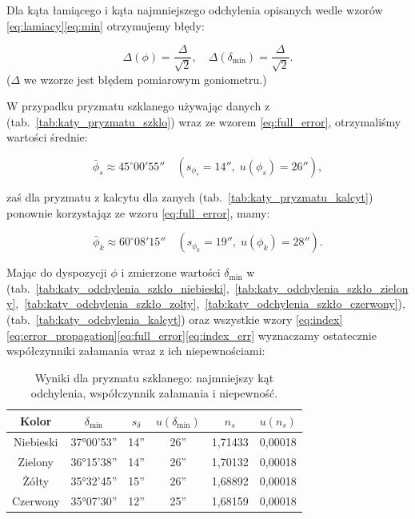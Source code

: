 \documentclass[12pt]{article}
\begin{document}
Dla kąta łamiącego i kąta najmniejszego odchylenia opisanych wedle wzorów \eqref{eq:lamiacy}\eqref{eq:min} otrzymujemy błędy: 

\[
    \Delta(\phi) = \frac{\Delta}{\sqrt{2}}, \quad
    \Delta(\delta_{\mathrm{min}}) = \frac{\Delta}{\sqrt{2}}.
\]
($\Delta$ we wzorze jest błędem pomiarowym goniometru.)

W przypadku pryzmatu szklanego używając danych z (tab.~\ref{tab:katy_pryzmatu_szklo}) wraz ze wzorem \eqref{eq:full_error}, otrzymaliśmy wartości średnie:

\[
    \bar{\phi}_{s} \approx 45^\circ00'55'' \quad (s_{\phi_{s}} = 14'',\; u(\phi_{s}) = 26''),
\]

zaś dla pryzmatu z kalcytu dla zanych (tab.~\ref{tab:katy_pryzmatu_kalcyt}) ponownie korzystająz ze wzoru \eqref{eq:full_error}, mamy:

\[
    \bar{\phi}_{k} \approx 60^\circ08'15'' \quad (s_{\phi_{k}} = 19'',\; u(\phi_{k}) = 28'').
\]

Mając do dyspozycji $\phi$ i zmierzone wartości $\delta_{\mathrm{min}}$ w (tab.~\ref{tab:katy_odchylenia_szkło_niebieski},~\ref{tab:katy_odchylenia_szkło_zielony},~\ref{tab:katy_odchylenia_szkło_zolty},~\ref{tab:katy_odchylenia_szkło_czerwony}), (tab.~\ref{tab:katy_odchylenia_kalcyt})
oraz wszystkie wzory \eqref{eq:index}\eqref{eq:error_propagation}\eqref{eq:full_error}\eqref{eq:index_err} wyznaczamy ostatecznie współczynniki załamania wraz z ich niepewnościami:

\begin{table}[H]
    \centering
    \begin{tabular}{c|ccccc}
        \toprule
        \textbf{Kolor} & $\delta_{\mathrm{min}}$ & $s_{\delta}$ & $u(\delta_{\mathrm{min}})$ & $n_{s}$ & $u(n_{s})$ \\
        \midrule
        Niebieski & 37°00'53'' & 14'' & 26'' & 1{,}71433 & 0{,}00018 \\
        Zielony   & 36°15'38'' & 14'' & 26'' & 1{,}70132 & 0{,}00018 \\
        Żółty     & 35°32'45'' & 15'' & 26'' & 1{,}68892 & 0{,}00018 \\
        Czerwony  & 35°07'30'' & 12'' & 25'' & 1{,}68159 & 0{,}00018 \\
        \bottomrule
    \end{tabular}
    \caption{Wyniki dla pryzmatu szklanego: najmniejszy kąt odchylenia, współczynnik załamania i niepewność.}
    \label{tab:szklo_tabela}
\end{table}
\end{document}
